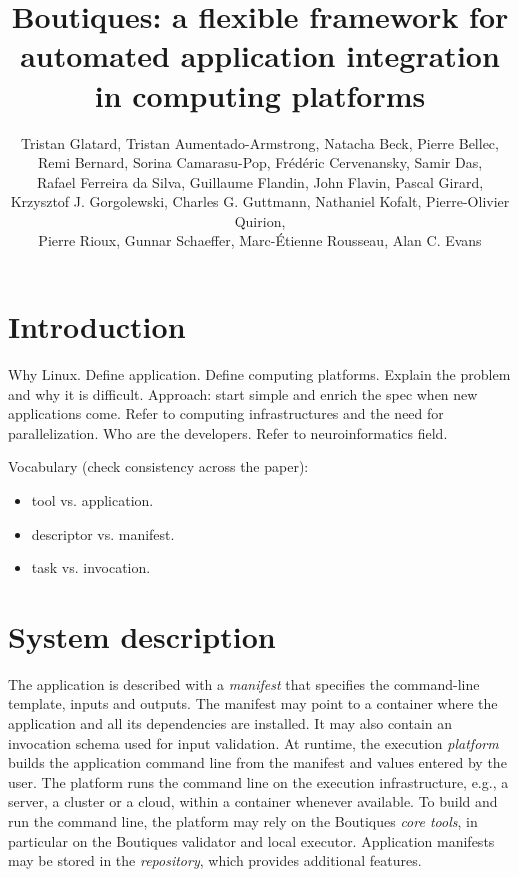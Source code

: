 \documentclass{article}
\title{Boutiques: a flexible framework for automated application integration in computing platforms}
\begin{document}
\author{Tristan Glatard, Tristan Aumentado-Armstrong, Natacha Beck, Pierre Bellec,\\
        Remi Bernard, Sorina Camarasu-Pop, Fr\'ed\'eric Cervenansky, Samir Das, \\
        Rafael Ferreira da Silva, Guillaume Flandin, John Flavin, Pascal Girard, \\
         Krzysztof J. Gorgolewski, Charles G. Guttmann, Nathaniel Kofalt, Pierre-Olivier Quirion,\\
         Pierre Rioux, Gunnar Schaeffer, Marc-\'Etienne Rousseau, Alan C. Evans}

\maketitle

\section{Introduction}

Why Linux. Define application. Define computing platforms. Explain the
problem and why it is difficult. Approach: start simple and enrich the
spec when new applications come. Refer to computing infrastructures
and the need for parallelization. Who are
the developers. Refer to neuroinformatics field. 

Vocabulary (check consistency across the paper):
\begin{itemize}
\item tool vs. application.
\item descriptor vs. manifest.
\item task vs. invocation.
\end{itemize}

\section{System description}

The application is described with a \emph{manifest} that specifies the
command-line template, inputs and outputs. The manifest may point to a
container where the application and all its dependencies are
installed. It may also contain an invocation schema used for input
validation. At runtime, the execution \emph{platform} builds the
application command line from the manifest and values entered by the
user. The platform runs the command line on the execution
infrastructure, e.g., a server, a cluster or a cloud, within a
container whenever available. To build and run the command line, the
platform may rely on the Boutiques \emph{core tools}, in particular on
the Boutiques validator and local executor. Application manifests may
be stored in the \emph{repository}, which provides additional features.
\end{document}
